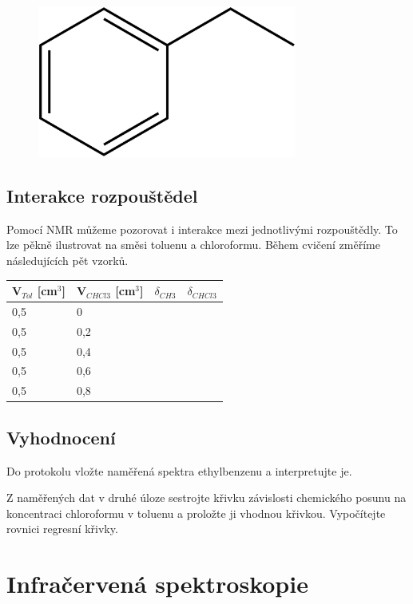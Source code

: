 \documentclass[12pt]{article}
\begin{document}
\begin{figure}[h]
	\includegraphics[keepaspectratio,height=5cm]{img/ethylbenzene.png}
\end{figure}
\newpage

\subsection{Interakce rozpouštědel}

Pomocí NMR můžeme pozorovat i interakce mezi jednotlivými rozpouštědly. To lze pěkně ilustrovat na směsi toluenu a chloroformu. Během cvičení změříme následujících pět vzorků.
\\

\begin{tabular}{|l|l|l|l|}
	\hline
	\textbf{V$_{Tol}$ [cm$^3$]} & \textbf{V$_{CHCl3}$ [cm$^3$]} & \textbf{$\delta_{CH3}$}
	& \textbf{$\delta_{CHCl3}$} \\\hline
	0,5 & 0 & & \\\hline
	0,5 & 0,2 & & \\\hline
	0,5 & 0,4 & & \\\hline
	0,5 & 0,6 & & \\\hline
	0,5 & 0,8 & & \\\hline
\end{tabular}

\subsection{Vyhodnocení}

Do protokolu vložte naměřená spektra ethylbenzenu a interpretujte je.

Z naměřených dat v druhé úloze sestrojte křivku závislosti chemického posunu na koncentraci chloroformu v toluenu a proložte ji vhodnou křivkou. Vypočítejte rovnici regresní křivky.

\pagebreak

\section{Infračervená spektroskopie}
\end{document}
